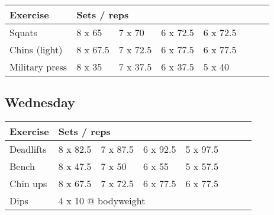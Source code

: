 \documentclass[12pt, a4paper]{article}%
\begin{document}
  \begin{tabular}{l|lllllll}
  \hspace{0.75em} \textbf{Exercise} & \multicolumn{ 7 }{l}{ \textbf{Sets / reps} } \\ \hline

            \hspace{0.75em} Squats
            & 8 x 65
            & 7 x 70
            & 6 x 72.5
            & 6 x 72.5
            & 
            & 
            & 
            \\


            \hspace{0.75em} Chins (light)
            & 8 x 67.5
            & 7 x 72.5
            & 6 x 77.5
            & 6 x 77.5
            & 
            & 
            & 
            \\


            \hspace{0.75em} Military press
            & 8 x 35
            & 7 x 37.5
            & 6 x 37.5
            & 5 x 40
            & 
            & 
            & 
            \\


  \end{tabular}

  \subsection*{\hspace{0.5em} Wednesday }


  \begin{tabular}{l|lllllll}
  \hspace{0.75em} \textbf{Exercise} & \multicolumn{ 7 }{l}{ \textbf{Sets / reps} } \\ \hline

            \hspace{0.75em} Deadlifts
            & 8 x 82.5
            & 7 x 87.5
            & 6 x 92.5
            & 5 x 97.5
            & 
            & 
            & 
            \\


            \hspace{0.75em} Bench
            & 8 x 47.5
            & 7 x 50
            & 6 x 55
            & 5 x 57.5
            & 
            & 
            & 
            \\


            \hspace{0.75em} Chin ups
            & 8 x 67.5
            & 7 x 72.5
            & 6 x 77.5
            & 6 x 77.5
            & 
            & 
            & 
            \\


   \hspace{0.75em} Dips &  \multicolumn{ 7 }{l}{ 4 x 10 @ bodyweight } \\
  \end{tabular}
\end{document}
